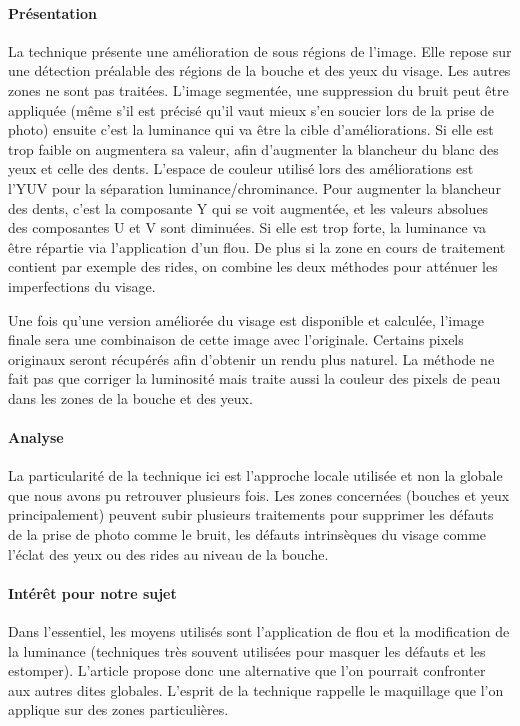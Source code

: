 \documentclass[11pt, french]{report-rd-info}
\begin{document}
\paragraph{Présentation}
La technique présente une amélioration de sous régions de l’image.  Elle repose sur une détection préalable des régions de la bouche et des yeux du visage. Les autres zones ne sont pas traitées.
L’image segmentée, une suppression du bruit peut être appliquée (même s’il est précisé qu’il vaut mieux s’en soucier lors de la prise de photo) ensuite c’est la luminance qui va être la cible d’améliorations. Si elle est trop faible on augmentera sa valeur, afin d’augmenter la blancheur du blanc des yeux et celle des dents. L’espace de couleur utilisé lors des améliorations est l’YUV pour la séparation luminance/chrominance. Pour augmenter la blancheur des dents, c’est la composante Y qui se voit augmentée, et les valeurs absolues des composantes U et V sont diminuées.
Si elle est trop forte, la luminance va être répartie via l’application d’un flou. De plus si la zone en cours de traitement contient par exemple des rides, on combine les deux méthodes pour atténuer les imperfections du visage.

Une fois qu’une version améliorée du visage est disponible et calculée, l’image finale sera une combinaison de cette image avec l’originale. Certains pixels originaux seront récupérés afin d’obtenir un rendu plus naturel.
La méthode ne fait pas que corriger la luminosité mais traite aussi la couleur des pixels de peau dans les zones de la bouche et des yeux.
\paragraph{Analyse}
La particularité de la technique ici est l’approche locale utilisée et non la globale que nous avons pu retrouver plusieurs fois. Les zones concernées (bouches et yeux principalement) peuvent subir plusieurs traitements pour supprimer les défauts de la prise de photo comme le bruit, les défauts intrinsèques du visage comme l’éclat des yeux ou des rides au niveau de la bouche.
\paragraph{Intérêt pour notre sujet}
Dans l’essentiel, les moyens utilisés sont l’application de flou et la modification de la luminance (techniques très souvent utilisées pour masquer les défauts et les estomper). L’article propose donc une alternative que l’on pourrait confronter aux autres dites globales. L’esprit de la technique rappelle le maquillage que l’on applique sur des zones particulières.
\end{document}
